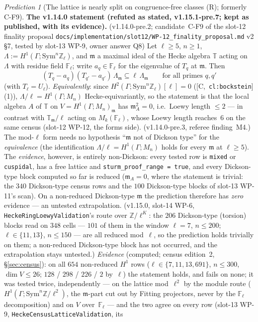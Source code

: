 \documentclass[11pt]{article}
\theoremstyle{remark}
\newtheorem{prediction}[theorem]{Prediction}
\newcommand{\F}{\mathbb{F}}
\newcommand{\Z}{\mathbb{Z}}
\newcommand{\Sym}{\mathrm{Sym}}
\newcommand{\Ga}{\Gamma}
\newcommand{\Fl}{\F_\ell}
\newcommand{\T}{\mathbb{T}}
\newcommand{\m}{\mathfrak{m}}
\newcommand{\Mn}{M_n}
\newcommand{\HA}[1]{[C,~\texttt{#1}]}      %
\begin{document}
\begin{prediction}[The lattice is nearly split on congruence-free classes (R); formerly C-F9]
\medskip\noindent\textbf{The v1.14.0 statement (refuted as stated, v1.15.1-pre.7; kept as published, with its evidence).}
(v1.14.0-pre.2; candidate~C-F9 of
the slot-12 finality proposal \texttt{docs/implementation/slot12/WP-12\_finality\_proposal.md} v2 \S7, tested by
slot-13 WP-9, owner answer Q8)
Let $\ell\ge5$, $n\ge1$, $\Lambda:=H^1(\Ga;\Sym^n\Z_\ell)$, and $\m$ a maximal ideal of the Hecke algebra $\T$ acting
on $\Lambda$ with residue field $\Fl$; write $a_q\in\Fl$ for the eigenvalue of $T_q$ at $\m$. Then
\[
  (T_q-a_q)(T_{q'}-a_{q'})\,\Lambda_\m\subseteq\ell\,\Lambda_\m\qquad\text{for all primes }q,q'
\]
(with $T_\ell=U_\ell$). \emph{Equivalently}: since $H^2(\Ga;\Sym^n\Z_\ell)[\ell]=0$ (\HA{cl:bockstein}(1)),
$\Lambda/\ell=H^1(\Ga;\Mn)$ Hecke-equivariantly, so the statement is that the local algebra $A$ of $\T$ on
$V=H^1(\Ga;\Mn)_\m$ has $\m_A^2=0$, i.e.\ Loewy length $\le2$ --- in contrast with $\T_\m/\ell$ acting on $M_k(\Fl)$,
whose Loewy length reaches~$6$ on the same census (slot-12 WP-12, the forms side). (v1.14.0-pre.3, referee
finding~M4.) The mod-$\ell$ form needs no hypothesis ``$\m$ not of Dickson type'' for the \emph{equivalence} (the
identification $\Lambda/\ell=H^1(\Ga;\Mn)$ holds for every $\m$ at $\ell\ge5$). The \emph{evidence}, however, is
entirely non-Dickson: every tested row is \texttt{mixed} or \texttt{cuspidal}, has a free lattice and
\texttt{sturm\_proof\_range = true}, and every Dickson-type block computed so far is reduced ($\m_A=0$, where the
statement is trivial: the $340$ Dickson-type census rows and the $100$ Dickson-type blocks of slot-13 WP-11's scan).
On a non-reduced Dickson-type $\m$ the prediction therefore has \emph{zero} evidence --- an untested extrapolation.
(v1.15.0, slot-14 WP-6, \texttt{HeckeRingLoewyValidation}'s route over $\Z/\ell^{K}$: the $206$ Dickson-type (torsion) blocks
read on $348$ cells --- $101$ of them in the window $\ell=7$, $n\le200$; $\ell\in\{11,13\}$, $n\le150$ --- are all reduced mod~$\ell$, so
the prediction holds trivially on them; a non-reduced Dickson-type block has not occurred, and the extrapolation stays untested.)
\emph{Evidence} (computed; census edition~2, \S\ref{sec:census}): on all $654$ non-reduced $H^1$ rows
($\ell\in\{7,11,13,691\}$, $n\le300$, $\dim V\le26$; $128$ / $298$ / $226$ / $2$ by~$\ell$) the statement holds, and
fails on none; it was tested twice, independently --- on the lattice mod~$\ell^2$ by the module route
($H^1(\Ga;\Sym^n\Z/\ell^2)$, the $\m$-part cut out by Fitting projectors, never by the $\Fl$ decomposition) and on $V$
over~$\Fl$ --- and the two agree on every row (slot-13 WP-9, \texttt{HeckeCensusLatticeValidation}, its

\end{prediction}
\end{document}
